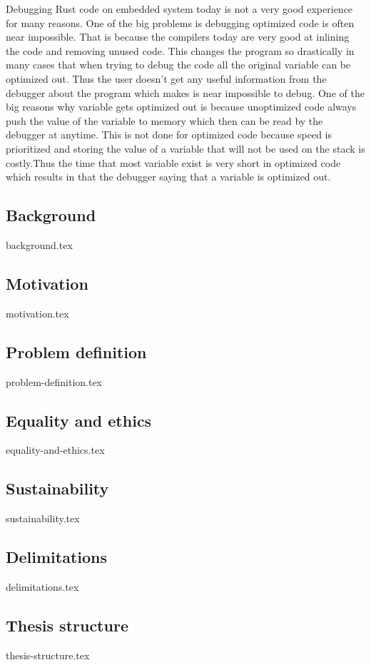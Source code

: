 
Debugging Rust code on embedded system today is not a very good experience for many reasons.
One of the big problems is debugging optimized code is often near impossible.
That is because the compilers today are very good at inlining the code and removing unused code.
This changes the program so drastically in many cases that when trying to debug the code all the original variable can be optimized out.
Thus the user doesn't get any useful information from the debugger about the program which makes is near impossible to debug.
One of the big reasons why variable gets optimized out is because unoptimized code always push the value of the variable to memory which then can be read by the debugger at anytime.
This is not done for optimized code because speed is prioritized and storing the value of a variable that will not be used on the stack is costly.Thus the time that most variable exist is very short in optimized code which results in that the debugger saying that a variable is optimized out.

\subsection{Background}
{background.tex}

\subsection{Motivation}
{motivation.tex}

\subsection{Problem definition}
\label{sec:problemdefinition}
{problem-definition.tex}

\subsection{Equality and ethics}
{equality-and-ethics.tex}

\subsection{Sustainability}
{sustainability.tex}

\subsection{Delimitations}
{delimitations.tex}

\subsection{Thesis structure}
{thesis-structure.tex}

